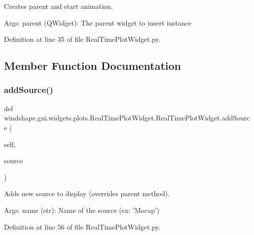 \begin{DoxyVerb}Creates parent and start animation.

Args:
    parent (QWidget): The parent widget to insert instance
\end{DoxyVerb}
 

Definition at line 35 of file Real\+Time\+Plot\+Widget.\+py.



\subsection{Member Function Documentation}
\mbox{\label{classwindshape_1_1gui_1_1widgets_1_1plots_1_1_real_time_plot_widget_1_1_real_time_plot_widget_a5d037e52b4db09c9f67653b1040e21b3}} 
\subsubsection{\texorpdfstring{add\+Source()}{addSource()}}
{\footnotesize\ttfamily def windshape.\+gui.\+widgets.\+plots.\+Real\+Time\+Plot\+Widget.\+Real\+Time\+Plot\+Widget.\+add\+Source (\begin{DoxyParamCaption}\item[{}]{self,  }\item[{}]{source }\end{DoxyParamCaption})}

\begin{DoxyVerb}Adds new source to display (overrides parent method).

Args:
    name (str): Name of the source (ex: 'Mocap')
\end{DoxyVerb}
 

Definition at line 56 of file Real\+Time\+Plot\+Widget.\+py.

